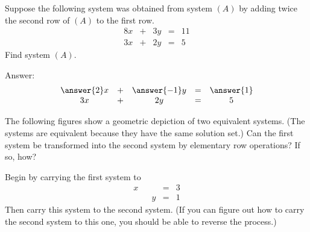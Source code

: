 \documentclass{ximera}
\begin{document}
\begin{problem}\label{prob:reverseelemrowops}
Suppose the following system was obtained from system $(A)$ by adding twice the second row of $(A)$ to the first row.
$$\begin{array}{ccccc}
      8x &+ &3y&= &11\\
      3x&+ &2y&=&5      
    \end{array}$$
    Find system $(A)$.
    
    Answer:
    $$\begin{array}{ccccc}
      \answer{2}x &+ &\answer{-1}y&= &\answer{1}\\
      3x&+ &2y&=&5      
    \end{array}$$
    
\end{problem}

\begin{problem}\label{prob:reverserowopsgeometry}
The following figures show a geometric depiction of two equivalent systems.  (The systems are equivalent because they have the same solution set.)  Can the first system be transformed into the second system by elementary row operations?  If so, how?

 
 \begin{center}
\quad\quad
{}
\end{center}


\begin{hint}
Begin by carrying the first system to 
$$\begin{array}{ccccc}
      x & &&= &3\\
      & &y&=&1      
    \end{array}$$
    Then carry this system to the second system.  (If you can figure out how to carry the second system to this one, you should be able to reverse the process.)
\end{hint}

\end{problem}
\end{document}

